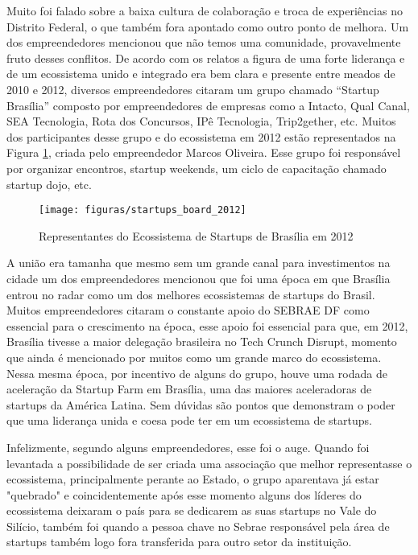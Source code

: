 Muito foi falado sobre a baixa cultura de colaboração e troca de experiências no Distrito Federal, o que também fora apontado como outro ponto de melhora. Um dos empreendedores mencionou que não temos uma comunidade, provavelmente fruto desses conflitos. De acordo com os relatos a figura de uma forte liderança e de um ecossistema unido e integrado era bem clara e presente entre meados de 2010 e 2012, diversos empreendedores citaram um grupo chamado ``Startup Brasília'' composto por empreendedores de empresas como a Intacto, Qual Canal, SEA Tecnologia, Rota dos Concursos, IPê Tecnologia, Trip2gether, etc. Muitos dos participantes desse grupo e do ecossistema em 2012 estão representados na Figura \ref{figure:startups_board_2012}, criada pelo empreendedor Marcos Oliveira. Esse grupo foi responsável por organizar encontros, startup weekends, um ciclo de capacitação chamado startup dojo, etc.

\begin{figure}[!htb]
	\centering
	\texttt{[image: figuras/startups\_board\_2012]}
	\caption{Representantes do Ecossistema de Startups de Brasília em 2012}
	\label{figure:startups_board_2012}
\end{figure} 

A união era tamanha que mesmo sem um grande canal para investimentos na cidade um dos empreendedores mencionou que foi uma época em que Brasília entrou no radar como um dos melhores ecossistemas de startups do Brasil. Muitos empreendedores citaram o constante apoio do SEBRAE DF como essencial para o crescimento na época, esse apoio foi essencial para que, em 2012, Brasília tivesse a maior delegação brasileira no Tech Crunch Disrupt, momento que ainda é mencionado por muitos como um grande marco do ecossistema. Nessa mesma época, por incentivo de alguns do grupo, houve uma rodada de aceleração da Startup Farm em Brasília, uma das maiores aceleradoras de startups da América Latina. Sem dúvidas são pontos que demonstram o poder que uma liderança unida e coesa pode ter em um ecossistema de startups. 

Infelizmente, segundo alguns empreendedores, esse foi o auge. Quando foi levantada a possibilidade de ser criada uma associação que melhor representasse o ecossistema, principalmente perante ao Estado, o grupo aparentava já estar "quebrado" e coincidentemente após esse momento alguns dos líderes do ecossistema deixaram o país para se dedicarem as suas startups no Vale do Silício, também foi quando a pessoa chave no Sebrae responsável pela área de startups também logo fora transferida para outro setor da instituição.


